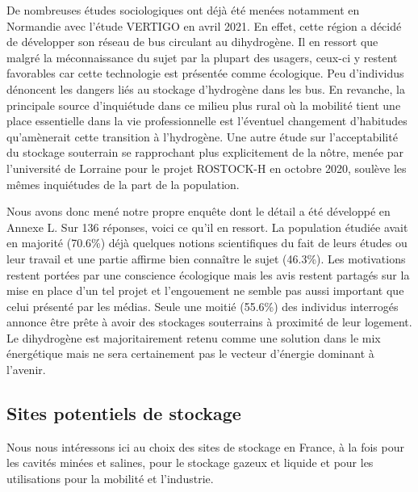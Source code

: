 \documentclass[11pt,french,a4paper]{article}
\begin{document}
De nombreuses études sociologiques ont déjà été menées notamment en Normandie avec l’étude VERTIGO en avril 2021. En effet, cette région a décidé de développer son réseau de bus circulant au dihydrogène. Il en ressort que malgré la méconnaissance du sujet par la plupart des usagers, ceux-ci y restent favorables car cette technologie est présentée comme écologique. Peu d’individus dénoncent les dangers liés au stockage d’hydrogène dans les bus. En revanche, la principale source d’inquiétude dans ce milieu plus rural où la mobilité tient une place essentielle dans la vie professionnelle est l’éventuel changement d’habitudes qu’amènerait cette transition à l’hydrogène.
Une autre étude sur l’acceptabilité du stockage souterrain se rapprochant plus explicitement de la nôtre, menée par l’université de Lorraine pour le projet ROSTOCK-H en octobre 2020, soulève les mêmes inquiétudes de la part de la population.

Nous avons donc mené notre propre enquête dont le détail a été développé en Annexe L. Sur 136 réponses, voici ce qu'il en ressort. La population étudiée avait en majorité (70.6\%) déjà quelques notions scientifiques du fait de leurs études ou leur travail et une partie affirme bien connaître le sujet (46.3\%). Les motivations restent portées par une conscience écologique mais les avis restent partagés sur la mise en place d’un tel projet et l’engouement ne semble pas aussi important que celui présenté par les médias. Seule une moitié (55.6\%) des individus interrogés annonce être prête à avoir des stockages souterrains à proximité de leur logement. Le dihydrogène est majoritairement retenu comme une solution dans le mix énergétique mais ne sera certainement pas le vecteur d’énergie dominant à l’avenir.


\subsection{Sites potentiels de stockage}
Nous nous intéressons ici au choix des sites de stockage en France, à la fois pour les cavités minées et salines, pour le stockage gazeux et liquide et pour les utilisations pour la mobilité et l'industrie. 
\end{document}
